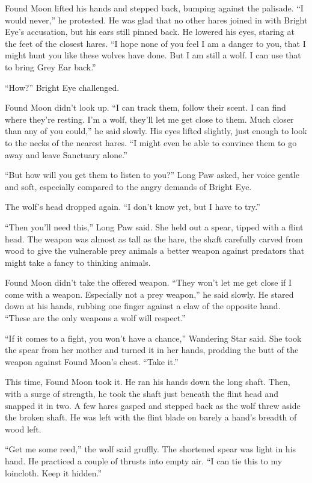 Found Moon lifted his hands and stepped back, bumping against the palisade. ``I would never,'' he protested. He was glad that no other hares joined in with Bright Eye's accusation, but his ears still pinned back. He lowered his eyes, staring at the feet of the closest hares. ``I hope none of you feel I am a danger to you, that I might hunt you like these wolves have done. But I am still a wolf. I can use that to bring Grey Ear back.''

``How?'' Bright Eye challenged.

Found Moon didn't look up. ``I can track them, follow their scent. I can find where they're resting. I'm a wolf, they'll let me get close to them. Much closer than any of you could,'' he said slowly. His eyes lifted slightly, just enough to look to the necks of the nearest hares. ``I might even be able to convince them to go away and leave Sanctuary alone.''

``But how will you get them to listen to you?'' Long Paw asked, her voice gentle and soft, especially compared to the angry demands of Bright Eye.

The wolf's head dropped again. ``I don't know yet, but I have to try.''

``Then you'll need this,'' Long Paw said. She held out a spear, tipped with a flint head. The weapon was almost as tall as the hare, the shaft carefully carved from wood to give the vulnerable prey animals a better weapon against predators that might take a fancy to thinking animals.

Found Moon didn't take the offered weapon. ``They won't let me get close if I come with a weapon. Especially not a prey weapon,'' he said slowly. He stared down at his hands, rubbing one finger against a claw of the opposite hand. ``These are the only weapons a wolf will respect.''

``If it comes to a fight, you won't have a chance,'' Wandering Star said. She took the spear from her mother and turned it in her hands, prodding the butt of the weapon against Found Moon's chest. ``Take it.''

This time, Found Moon took it. He ran his hands down the long shaft. Then, with a surge of strength, he took the shaft just beneath the flint head and snapped it in two. A few hares gasped and stepped back as the wolf threw aside the broken shaft. He was left with the flint blade on barely a hand's breadth of wood left.

``Get me some reed,'' the wolf said gruffly. The shortened spear was light in his hand. He practiced a couple of thrusts into empty air. ``I can tie this to my loincloth. Keep it hidden.''


